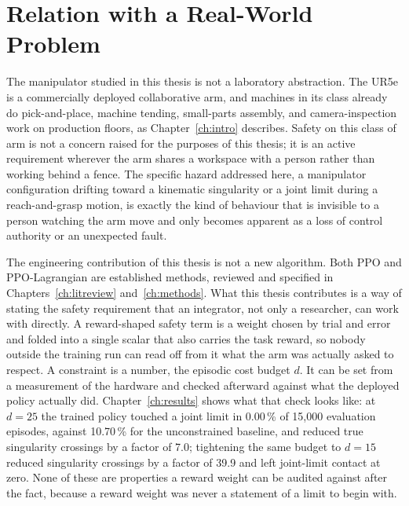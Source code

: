 \chapter{Relation with a Real-World Problem}\label{ch:realworld}

The manipulator studied in this thesis is not a laboratory abstraction. The UR5e is a
commercially deployed collaborative arm, and machines in its class already do pick-and-place,
machine tending, small-parts assembly, and camera-inspection work on production floors, as
Chapter~\ref{ch:intro} describes. Safety on this class of arm is not a concern raised for the
purposes of this thesis; it is an active requirement wherever the arm shares a workspace with a
person rather than working behind a fence. The specific hazard addressed here, a manipulator
configuration drifting toward a kinematic singularity or a joint limit during a reach-and-grasp
motion, is exactly the kind of behaviour that is invisible to a person watching the arm move and
only becomes apparent as a loss of control authority or an unexpected fault.

The engineering contribution of this thesis is not a new algorithm. Both PPO and PPO-Lagrangian
are established methods, reviewed and specified in Chapters~\ref{ch:litreview}
and~\ref{ch:methods}. What this thesis contributes is a way of stating the safety requirement
that an integrator, not only a researcher, can work with directly. A reward-shaped safety term is
a weight chosen by trial and error and folded into a single scalar that also carries the task
reward, so nobody outside the training run can read off from it what the arm was actually asked
to respect. A constraint is a number, the episodic cost budget \(d\). It can be set from a
measurement of the hardware and checked afterward against what the deployed policy actually did.
Chapter~\ref{ch:results} shows what that check looks like: at \(d=25\) the trained policy touched
a joint limit in 0.00\,\% of 15{,}000 evaluation episodes, against 10.70\,\% for the unconstrained
baseline, and reduced true singularity crossings by a factor of 7.0; tightening the same budget to
\(d=15\) reduced singularity crossings by a factor of 39.9 and left joint-limit contact at zero.
None of these are properties a reward weight can be audited against after the fact, because a
reward weight was never a statement of a limit to begin with.

